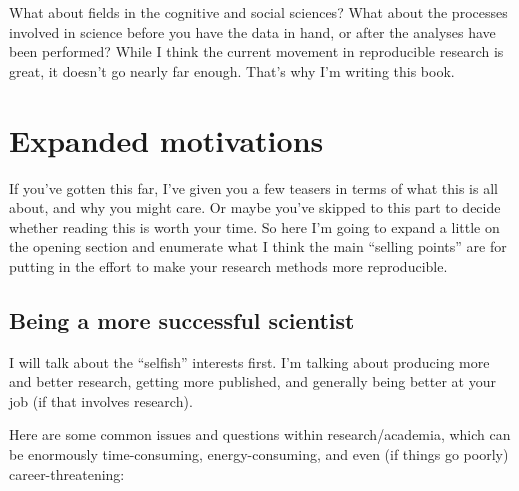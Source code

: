 \documentclass{book}
\begin{document}
What about fields in the cognitive and social sciences?  What about the processes involved in science before you have the data in hand, or after the analyses have been performed?  While I think the current movement in reproducible research is great, it doesn't go nearly far enough. That's why I'm writing this book.
\section{Expanded motivations}
\label{sec-2-3}
\label{expandedmotivations}

If you've gotten this far, I've given you a few teasers in terms of what this is all about, and why you might care.  Or maybe you've skipped to this part to decide whether reading this is worth your time.  So here I'm going to expand a little on the opening section and enumerate what I think the main ``selling points'' are for putting in the effort to make your research methods more reproducible.
\subsection{Being a more successful scientist}
\label{sec-2-3-1}
\label{success}

I will talk about the ``selfish'' interests first. I'm talking about producing more and better research, getting more published, and generally being better at your job (if that involves research).

Here are some common issues and questions within research/academia, which can be enormously time-consuming, energy-consuming, and even (if things go poorly) career-threatening:
\end{document}
